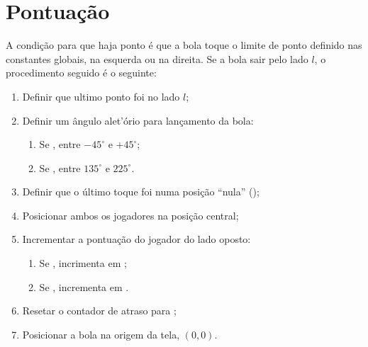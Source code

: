 \documentclass[12pt,a4paper,oneside]{article}
\begin{document}
\section{Pontua\c c\~ao}

A condi\c c\~ao para que haja ponto \'e que a bola toque o limite de ponto
definido nas constantes globais, na esquerda ou na direita.
Se a bola sair pelo lado $l$, o procedimento seguido \'e o seguinte:
\begin{enumerate}
    \item Definir que ultimo ponto foi no lado $l$;
    
    \item Definir um \^angulo alet'\'orio para lan\c camento da bola:
    \begin{enumerate}
        \item Se , entre $-45^\circ{}$ e $+45^\circ{}$;
        \item Se , entre $135^\circ{}$ e $225^\circ{}$.
    \end{enumerate}

    \item Definir que o \'ultimo toque foi numa posi\c c\~ao ``nula'' ();
    \item Posicionar ambos os jogadores na posi\c c\~ao central;
    
    \item Incrementar a pontua\c c\~ao do jogador do lado oposto:
    \begin{enumerate}
        \item Se , incrimenta em ;
        \item Se , incrementa em .
    \end{enumerate}

    \item Resetar o contador de atraso para ;
    \item Posicionar a bola na origem da tela, $(0,0)$.
\end{enumerate}
\end{document}
